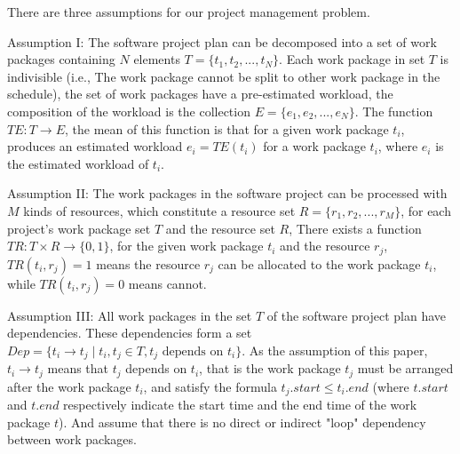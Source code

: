 %
There are three assumptions for our project management problem.

Assumption I: The software project plan can be decomposed into a set of
work packages containing $N$ elements $T = \{t_1, t_2, ..., t_N \}$.
Each work package in set $T$ is indivisible (i.e., The work package cannot be
split to other work package in the schedule), the set of work packages have a
pre-estimated workload, the composition of the workload is the collection
$E = \{e _1, e_2, ..., e_N \}$. The function $TE: T \rightarrow E$,
the mean of this function is that for a given work package $t_i$, produces an
estimated workload $e_i = TE(t_i)$ for a work package $t_i$, where $e_i$ is the
estimated workload of $t_i$.


Assumption II: The work packages in the software project  can be
processed with $M$ kinds of resources, which constitute a resource set
$R = \{r_1, r_2, ..., r_M \}$, for each project's work package set $T$ and the
resource set $R$, There exists a function $TR: T \times R \rightarrow \{0, 1\}$,
for the given work package $t_i$ and the resource $r_j$, $TR(t_i, r_j) = 1$
means the resource $r_j$ can be allocated to the work package $t_i$, while
$TR(t_i, r_j) = 0$ means cannot.


Assumption III: All work packages in the set $T$ of the software project
plan have dependencies. These dependencies form a set
$Dep= \{t_i \rightarrow t_j \mid t_i, t_j \in T, t_j \text{ depends on } t_i\}$.
As the assumption of this paper, $t_i \rightarrow t_j$ means that $t_j$ depends
on $t_i$, that is the work package $t_j$ must be arranged after the work
package $t_i$, and satisfy the formula $t_j.start \leq t_i.end$ (where $t.start$
and $t.end$ respectively indicate the start time and the end time of the work
package $t$).  And assume that there is no direct or indirect "loop" dependency
between work packages.


  \vspace{-2mm}


